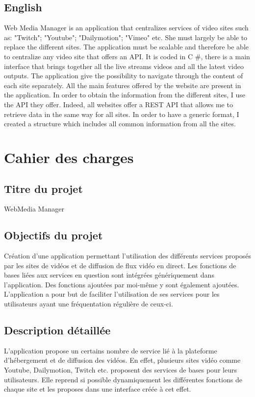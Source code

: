 \documentclass[11pt]{report} %
\begin{document}
	\section{English}
		Web Media Manager is an application that centralizes services of video sites such as: "Twitch";
		"Youtube"; "Dailymotion"; "Vimeo" etc. She must largely be able to replace the
		different sites. The application must be scalable and therefore be able to centralize any video site
		that offers an API.
		It is coded in C \#, there is a main interface that brings together all the live streams videos
		and all the latest video outputs. The application give the possibility to navigate
		through the content of each site separately. All the main features offered by the website are present in
		the application.
		In order to obtain the information from the different sites, I use the API they offer. Indeed, all websites
		offer a REST API that allows me to retrieve data in the same way for all sites. In order to have a
		generic format, I created a structure which includes all common information from all the sites.
		
\chapter{Cahier des charges}
	\section{Titre du projet}
	WebMedia Manager

	\section{Objectifs du projet}
	Création d’une application permettant l’utilisation des différents services proposés par les sites de vidéos et de diffusion de flux vidéo en direct.
	Les fonctions de bases liées aux services en question sont intégrées génériquement dans l’application.
	Des fonctions ajoutées par moi-même y sont également ajoutées.
	L’application a pour but de faciliter l’utilisation de ses services pour les utilisateurs ayant une fréquentation régulière de ceux-ci.

	\section{Description détaillée}
	L’application propose un certains nombre de service lié à la plateforme d’hébergement et de diffusion des vidéos. En effet, plusieurs sites vidéo comme Youtube, Dailymotion, Twitch etc. proposent des services de bases pour leurs utilisateurs.
	Elle reprend si possible dynamiquement les différentes fonctions de chaque site et les proposes dans une interface créée à cet effet.
\end{document}
